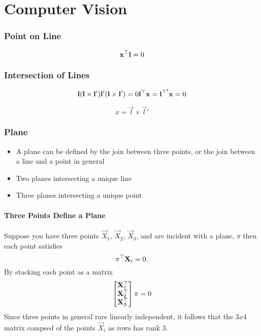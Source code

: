 \chapter{Computer Vision}

\subsection{Point on Line}

\begin{equation}
  {{{\mathbf{x}}^{\top}}} {\mathbf{l}} = 0
\end{equation}


\subsection{Intersection of Lines}

\begin{equation}
  {\mathbf{l}} ({\mathbf{l}} \times {\mathbf{l}}')
  {\mathbf{l}}' ({\mathbf{l}} \times {\mathbf{l}}')
  = 0 \\
  {{{\mathbf{l}}^{\top}}} {\mathbf{x}}
  = {{{\mathbf{l}}^{\top}}}' {\mathbf{x}}
  = 0
\end{equation}

\begin{equation}
  x = \Vec{l} \times \Vec{l}'
\end{equation}


\subsection{Plane}

\begin{itemize}
  \item{A plane can be defined by the join between three points, or the join
        between a line and a point in general}
  \item{Two planes intersecting a unique line}
  \item{Three planes intersecting a unique point}
\end{itemize}

\subsubsection{Three Points Define a Plane}

Suppose you have three points $\Vec{X}_{1}$, $\Vec{X}_{2}$, $\Vec{X}_{3}$, and
are incident with a plane, $\pi$ then each point satisfies
%
\begin{equation}
  {{\pi^{\top}}} {\mathbf{X}}_{i} = 0.
\end{equation}
%
By stacking each point as a matrix
%
\begin{align}
  \begin{bmatrix}
    {{{\mathbf{X}}_{1}^{\top}}} \\
    {{{\mathbf{X}}_{2}^{\top}}} \\
    {{{\mathbf{X}}_{3}^{\top}}}
  \end{bmatrix} \pi = 0
\end{align}
%
Since three points in general rare linearly independent, it follows that the
$3x4$ matrix compsed of the points $\Vec{X}_{i}$ as rows has rank 3.



